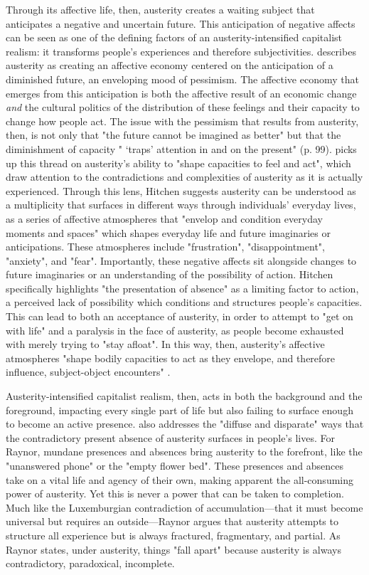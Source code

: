 Through its affective life, then, austerity creates a waiting subject that anticipates a negative and uncertain future. This anticipation of negative affects can be seen as one of the defining factors of an austerity-intensified capitalist realism: it transforms people's experiences and therefore subjectivities. \citet{coleman_austerity_2016} describes austerity as creating an affective economy centered on the anticipation of a diminished future, an enveloping mood of pessimism. The affective economy that emerges from this anticipation is both the affective result of an economic change \textit{and} the cultural politics of the distribution of these feelings and their capacity to change how people act. The issue with the pessimism that results from austerity, then, is not only that "the future cannot be imagined as better" but that the diminishment of capacity " `traps' attention in and on the present" (p. 99).  \citet[p. 102]{hitchen_living_2016}  picks up this thread on austerity's ability to "shape  capacities to feel and act", which draw attention to the contradictions and complexities of austerity as it is actually experienced. Through this lens, Hitchen suggests austerity can be understood as a multiplicity that surfaces in different ways through individuals' everyday lives, as a series of affective atmospheres that "envelop and condition everyday moments and spaces" which shapes everyday life and future imaginaries or anticipations. These atmospheres include "frustration", "disappointment", "anxiety", and "fear". Importantly, these negative affects sit alongside changes to future imaginaries or an understanding of the possibility of action. Hitchen specifically highlights "the presentation of absence" as a limiting factor to action, a perceived lack of possibility which conditions and structures people's capacities. This can lead to both an acceptance of austerity, in order to attempt to "get on with life" and a paralysis in the face of austerity, as people become exhausted with merely trying to "stay afloat". In this way, then, austerity's affective atmospheres "shape bodily capacities to act as they envelope, and therefore influence, subject-object encounters" \citep[p. 117]{hitchen_living_2016}.

Austerity-intensified capitalist realism, then, acts in both the background and the foreground, impacting every single part of life but also failing to surface enough to become an active presence. \citet[p. 195]{raynor_dramatising_2017} also addresses the "diffuse and disparate" ways that the contradictory present absence of austerity surfaces in people's lives. For Raynor, mundane presences and absences bring austerity to the forefront, like the "unanswered phone" or the "empty flower bed". These presences and absences take on a vital life and agency of their own, making apparent the all-consuming power of austerity. Yet this is never a power that can be taken to completion. Much like the Luxemburgian contradiction of accumulation—that it must become universal but requires an outside—Raynor argues that austerity attempts to structure all experience but is always fractured, fragmentary, and partial. As Raynor states, under austerity, things "fall apart" because austerity is always contradictory, paradoxical, incomplete.

